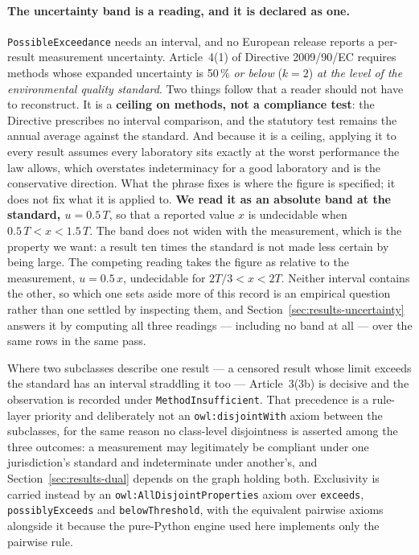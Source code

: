 \paragraph{The uncertainty band is a reading, and it is declared as one.}
\texttt{PossibleExceedance} needs an interval, and no European release reports
a per-result measurement uncertainty. Article~4(1) of Directive 2009/90/EC
requires methods whose expanded uncertainty is \num{50}\,\% \emph{or below}
($k=2$) \emph{at the level of the environmental quality standard}. Two things
follow that a reader should not have to reconstruct. It is a \textbf{ceiling on
methods, not a compliance test}: the Directive prescribes no interval
comparison, and the statutory test remains the annual average against the
standard. And because it is a ceiling, applying it to every result assumes
every laboratory sits exactly at the worst performance the law allows, which
overstates indeterminacy for a good laboratory and is the conservative
direction. What the phrase fixes is where the figure is specified; it does not
fix what it is applied to. \textbf{We read it as an
absolute band at the standard, $u = 0.5\,T$}, so that a reported value $x$ is
undecidable when $0.5\,T < x < 1.5\,T$. The band does not widen with the
measurement, which is the property we want: a result ten times the standard is
not made less certain by being large. The competing reading takes the figure as
relative to the measurement, $u = 0.5\,x$, undecidable for
$2T/3 < x < 2T$. Neither interval contains the other, so which one sets aside
more of this record is an empirical question rather than one settled by
inspecting them, and Section~\ref{sec:results-uncertainty} answers it by
computing all three readings --- including no band at all --- over the same
rows in the same pass.

Where two subclasses describe one result --- a censored result whose limit
exceeds the standard has an interval straddling it too --- Article~3(3b) is
decisive and the observation is recorded under \texttt{MethodInsufficient}. That
precedence is a rule-layer priority and deliberately not an
\texttt{owl:disjointWith} axiom between the subclasses, for the same reason no
class-level disjointness is asserted among the three outcomes: a measurement may
legitimately be compliant under one jurisdiction's standard and indeterminate
under another's, and Section~\ref{sec:results-dual} depends on the graph holding
both. Exclusivity is carried instead by an \texttt{owl:AllDisjointProperties}
axiom over \texttt{exceeds}, \texttt{possiblyExceeds} and
\texttt{belowThreshold}, with the equivalent pairwise axioms alongside it
because the pure-Python engine used here implements only the pairwise rule.

